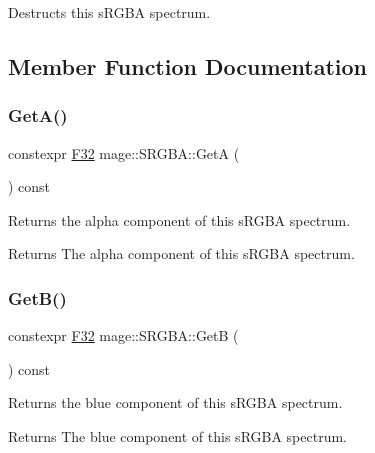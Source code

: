 Destructs this s\+R\+G\+BA spectrum. 

\subsection{Member Function Documentation}
\mbox{\label{structmage_1_1_s_r_g_b_a_a90ab59ec00e8e710a1d679cb0277373f}} 
\subsubsection{\texorpdfstring{Get\+A()}{GetA()}}
{\footnotesize\ttfamily constexpr \mbox{\hyperlink{namespacemage_aa97e833b45f06d60a0a9c4fc22ae02c0}{F32}} mage\+::\+S\+R\+G\+B\+A\+::\+GetA (\begin{DoxyParamCaption}{ }\end{DoxyParamCaption}) const\hspace{0.3cm}{\ttfamily [noexcept]}}

Returns the alpha component of this s\+R\+G\+BA spectrum.

\begin{DoxyReturn}{Returns}
The alpha component of this s\+R\+G\+BA spectrum. 
\end{DoxyReturn}
\mbox{\label{structmage_1_1_s_r_g_b_a_a5797da9eb025eab2d7e8b3331a8fd312}} 
\subsubsection{\texorpdfstring{Get\+B()}{GetB()}}
{\footnotesize\ttfamily constexpr \mbox{\hyperlink{namespacemage_aa97e833b45f06d60a0a9c4fc22ae02c0}{F32}} mage\+::\+S\+R\+G\+B\+A\+::\+GetB (\begin{DoxyParamCaption}{ }\end{DoxyParamCaption}) const\hspace{0.3cm}{\ttfamily [noexcept]}}

Returns the blue component of this s\+R\+G\+BA spectrum.

\begin{DoxyReturn}{Returns}
The blue component of this s\+R\+G\+BA spectrum. 
\end{DoxyReturn}
\mbox{\label{structmage_1_1_s_r_g_b_a_a5603f67bb32b82a28758dbf26eddc8fd}} 
